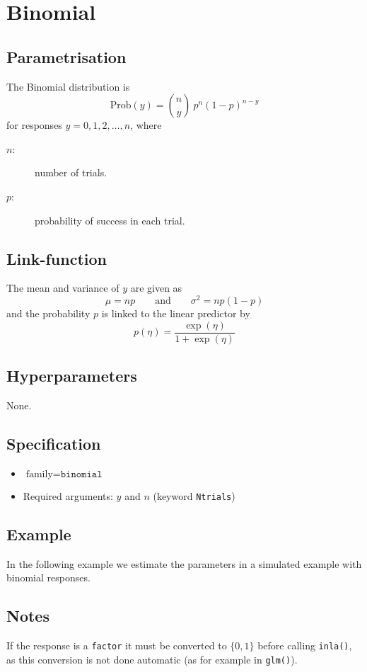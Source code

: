 \documentclass[a4paper,11pt]{article}
\begin{document}
\section*{Binomial}

\subsection*{Parametrisation}

The Binomial distribution is
\begin{displaymath}
    \text{Prob}(y) = {n \choose y} \ p^n (1-p)^{n-y}
\end{displaymath}
for responses $y=0, 1, 2, \ldots,n$, where
\begin{description}
\item[$n$:] number of trials.
\item[$p$:] probability of success in each trial.
\end{description}

\subsection*{Link-function}

The mean and variance of $y$ are given as
\begin{displaymath}
    \mu = np \qquad\text{and}\qquad \sigma^{2} = np(1-p)
\end{displaymath}
and the probability $p$ is linked to the linear predictor by
\begin{displaymath}
    p(\eta) = \frac{\exp(\eta)}{1+\exp(\eta)}
\end{displaymath}

\subsection*{Hyperparameters}

None.

\subsection*{Specification}

\begin{itemize}
\item $\text{family}=\texttt{binomial}$
\item Required arguments: $y$ and $n$ (keyword \texttt{Ntrials})
\end{itemize}

\subsection*{Example}

In the following example we estimate the parameters in a simulated
example with binomial responses.


\subsection*{Notes}

If the response is a \verb|factor| it must be converted to $\{0,1\}$
before calling \verb|inla()|, as this conversion is not done automatic
(as for example in \verb|glm()|).
\end{document}
